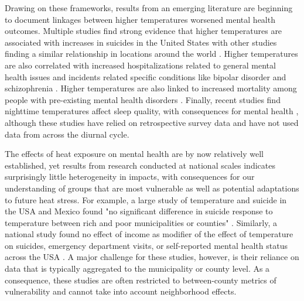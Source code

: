 \documentclass[titlepage]{article}
\begin{document}
Drawing on these frameworks, results from an emerging literature are beginning to document linkages between higher temperatures worsened mental health outcomes. Multiple studies find strong evidence that higher temperatures are associated with increases in suicides in the United States \citep{Burke2018Aug, Mullins2019Dec, Dixon2007May} with other studies finding a similar relationship in locations around the world \citep{Qi2014Dec, Likhvar2011Jan}. Higher temperatures are also correlated with increased hospitalizations related to general mental health issues \citep{Obradovich2018Oct, Mullins2019Dec} and incidents related specific conditions like bipolar disorder and schizophrenia \citep{Lee2007Jan, Sung2013Feb}. Higher temperatures are also linked to increased mortality among people with pre-existing mental health disorders \citep{Hansen2008Oct}.  Finally, recent studies find nighttime temperatures affect sleep quality, with consequences for mental health \citep{Obradovich2017May, Mullins2019Dec}, although these studies have relied on retrospective survey data and have not used data from across the diurnal cycle. 

The effects of heat exposure on mental health are by now relatively well established, yet results from research conducted at national scales indicates surprisingly little heterogeneity in impacts, with consequences for our understanding of groups that are most vulnerable as well as potential adaptations to future heat stress. For example, a large study of temperature and suicide in the USA and Mexico found "no significant difference in suicide response to temperature between rich and poor municipalities or counties" \citep{Burke2018Aug}. Similarly, a national study found no effect of income as modifier of the effect of temperature on suicides, emergency department visits, or self-reported mental health status across the USA \citep{Mullins2019Dec}. A major challenge for these studies, however, is their reliance on data that is typically aggregated to the municipality or county level. As a consequence, these studies are often restricted to between-county metrics of vulnerability and cannot take into account neighborhood effects.
\end{document}
